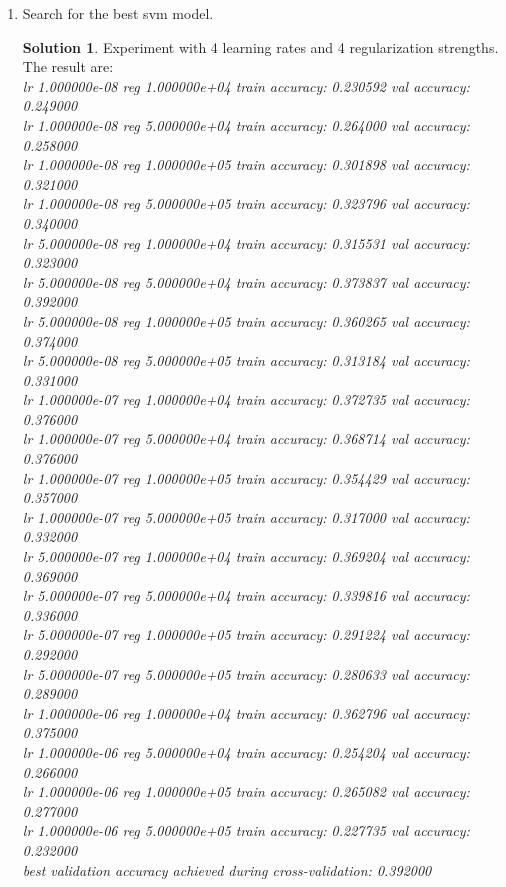 \documentclass[]{book}
\theoremstyle{definition}
\newtheorem*{soln}{Solution}
\begin{document}
\begin{enumerate}
    \item Search for the best svm model.
    \begin{soln}
    	Experiment with 4 learning rates and 4 regularization strengths. The result are:\\
    	\textit{lr 1.000000e-08 reg 1.000000e+04 train accuracy: 0.230592 val accuracy: 0.249000\\
    		lr 1.000000e-08 reg 5.000000e+04 train accuracy: 0.264000 val accuracy: 0.258000\\
    		lr 1.000000e-08 reg 1.000000e+05 train accuracy: 0.301898 val accuracy: 0.321000\\
    		lr 1.000000e-08 reg 5.000000e+05 train accuracy: 0.323796 val accuracy: 0.340000\\
    		lr 5.000000e-08 reg 1.000000e+04 train accuracy: 0.315531 val accuracy: 0.323000\\
    		lr 5.000000e-08 reg 5.000000e+04 train accuracy: 0.373837 val accuracy: 0.392000\\
    		lr 5.000000e-08 reg 1.000000e+05 train accuracy: 0.360265 val accuracy: 0.374000\\
    		lr 5.000000e-08 reg 5.000000e+05 train accuracy: 0.313184 val accuracy: 0.331000\\
    		lr 1.000000e-07 reg 1.000000e+04 train accuracy: 0.372735 val accuracy: 0.376000\\
    		lr 1.000000e-07 reg 5.000000e+04 train accuracy: 0.368714 val accuracy: 0.376000\\
    		lr 1.000000e-07 reg 1.000000e+05 train accuracy: 0.354429 val accuracy: 0.357000\\
    		lr 1.000000e-07 reg 5.000000e+05 train accuracy: 0.317000 val accuracy: 0.332000\\
    		lr 5.000000e-07 reg 1.000000e+04 train accuracy: 0.369204 val accuracy: 0.369000\\
    		lr 5.000000e-07 reg 5.000000e+04 train accuracy: 0.339816 val accuracy: 0.336000\\
    		lr 5.000000e-07 reg 1.000000e+05 train accuracy: 0.291224 val accuracy: 0.292000\\
    		lr 5.000000e-07 reg 5.000000e+05 train accuracy: 0.280633 val accuracy: 0.289000\\
    		lr 1.000000e-06 reg 1.000000e+04 train accuracy: 0.362796 val accuracy: 0.375000\\
    		lr 1.000000e-06 reg 5.000000e+04 train accuracy: 0.254204 val accuracy: 0.266000\\
    		lr 1.000000e-06 reg 1.000000e+05 train accuracy: 0.265082 val accuracy: 0.277000\\
    		lr 1.000000e-06 reg 5.000000e+05 train accuracy: 0.227735 val accuracy: 0.232000\\
    		best validation accuracy achieved during cross-validation: 0.392000}
    	

\end{soln}
\end{enumerate}
\end{document}

